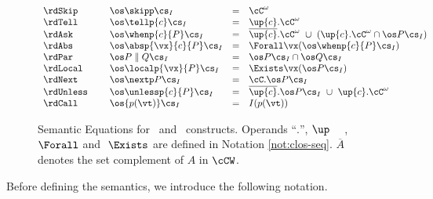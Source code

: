 \documentclass{tlp}
\begin{document}
\begin{figure}
{
$
\begin{array}{llcl}
\rdSkip \ \ \ \ & \os \skipp \cs_{I} & = & \cC^\omega \\
\rdTell \ \ \ \ & \os \tellp{c} \cs_{I} & = & \up{c}.\cC^\omega \\

\rdAsk \ \ \ \ & \os \whenp{c}{P} \cs_{I} & = & \overline{\up{c}}.\cC^\omega  \ \cup  \  (\up{c}.\cC^\omega \cap \os P \cs_I) \\




\rdAbs \ \ \ \ & \os \absp{\vx}{c}{P} \cs_{I} & = & \Forall \vx (\os \whenp{c}{P}\cs_I)  \\



\rdPar \ \ \ \ & \os P \parallel Q\cs_{I} & = & \os P \cs_{I} \cap \os Q \cs_{I}  \\

\rdLocal \ \ \ \ & \os \localp{\vx}{P} \cs_{I} & = & 
\Exists \vx(\os P \cs_I)
\\



{\rdNext} \ \ \ \ & \os \nextp P \cs_{I} & = & \cC.\os P\cs_I\\

{\rdUnless} \ \ \ \ & \os \unlessp{c}{P} \cs_{I} & = & \overline{\up{c}}.\os P \cs_I  \ \cup \ \up{c}.\cC^\omega \\








\rdCall \ \ \ \ & \os {p(\vt)} \cs_{I} & = & I(p(\vt))
\end{array}
$
}
\caption{Semantic Equations for \tccp\ and \utcc\ constructs. Operands ``$.$'', $\up$ \ \ ,\ $\Forall$   and $\ \Exists$ are defined in Notation \ref{not:clos-seq}. $\overline{A}$ denotes the set complement of $A$ in $\cCW$. \label{tab:densem} }
\end{figure}
Before  defining the semantics, we introduce the following notation.
\end{document}
